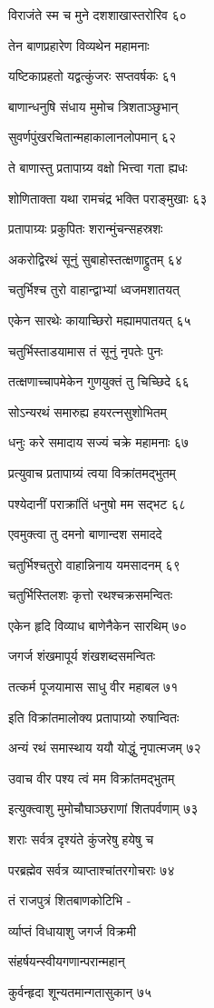 विराजंते स्म च मुने दशशाखास्तरोरिव ६०

तेन बाणप्रहारेण विव्यथेन महामनाः

यष्टिकाप्रहतो यद्वत्कुंजरः सप्तवर्षकः ६१

बाणान्धनुषि संधाय मुमोच त्रिशताञ्छुभान्

सुवर्णपुंखरचितान्महाकालानलोपमान् ६२

ते बाणास्तु प्रतापाग्र्य वक्षो भित्त्वा गता ह्यधः

शोणिताक्ता यथा रामचंद्र भक्ति पराङ्मुखाः ६३

प्रतापाग्र्यः प्रकुपितः शरान्मुंचन्सहस्रशः

अकरोद्विरथं सूनुं सुबाहोस्तत्क्षणाद्द्रुतम् ६४

चतुर्भिश्च तुरो वाहान्द्वाभ्यां ध्वजमशातयत्

एकेन सारथेः कायाच्छिरो मह्यामपातयत् ६५

चतुर्भिस्ताडयामास तं सूनुं नृपतेः पुनः

तत्क्षणाच्चापमेकेन गुणयुक्तं तु चिच्छिदे ६६

सोऽन्यरथं समारुह्य हयरत्नसुशोभितम्

धनुः करे समादाय सज्यं चक्रे महामनाः ६७

प्रत्युवाच प्रतापाग्र्यं त्वया विक्रांतमद्भुतम्

पश्येदानीं पराक्रांतिं धनुषो मम सद्भट ६८

एवमुक्त्वा तु दमनो बाणान्दश समाददे

चतुर्भिश्चतुरो वाहान्निनाय यमसादनम् ६९

चतुर्भिस्तिलशः कृत्तो रथश्चक्रसमन्वितः

एकेन हृदि विव्याध बाणेनैकेन सारथिम् ७०

जगर्ज शंखमापूर्य शंखशब्दसमन्वितः

तत्कर्म पूजयामास साधु वीर महाबल ७१

इति विक्रांतमालोक्य प्रतापाग्र्यो रुषान्वितः

अन्यं रथं समास्थाय ययौ योद्धुं नृपात्मजम् ७२

उवाच वीर पश्य त्वं मम विक्रांतमद्भुतम्

इत्युक्त्वाशु मुमोचौघाञ्छराणां शितपर्वणाम् ७३

शराः सर्वत्र दृश्यंते कुंजरेषु हयेषु च

परब्रह्मेव सर्वत्र व्याप्ताश्चांतरगोचराः ७४

तं राजपुत्रं शितबाणकोटिभि -

र्व्याप्तं विधायाशु जगर्ज विक्रमी

संहर्षयन्स्वीयगणान्परान्महान्

कुर्वन्हृदा शून्यतमान्गतासुकान् ७५

